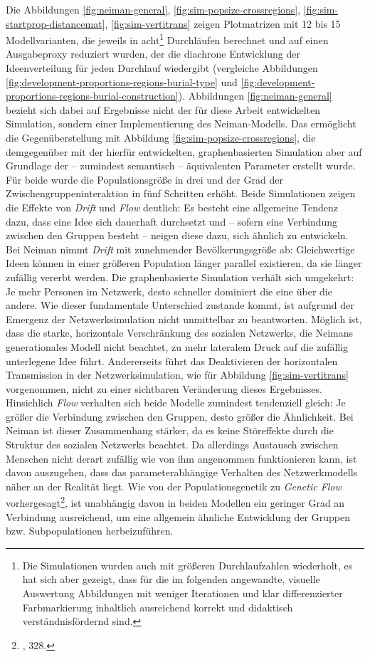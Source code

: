 \documentclass[openany,twoside,twocolumn]{book}
\let\rmarkdownfootnote\footnote%
\def\footnote{\protect\rmarkdownfootnote}
\begin{document}
Die Abbildungen \ref{fig:neiman-general},
\ref{fig:sim-popsize-crossregions}, \ref{fig:sim-startprop-distancemat},
\ref{fig:sim-vertitrans} zeigen Plotmatrizen mit 12 bis 15
Modellvarianten, die jeweils in acht\footnote{Die Simulationen wurden
  auch mit größeren Durchlaufzahlen wiederholt, es hat sich aber
  gezeigt, dass für die im folgenden angewandte, visuelle Auswertung
  Abbildungen mit weniger Iterationen und klar differenzierter
  Farbmarkierung inhaltlich ausreichend korrekt und didaktisch
  verständnisfördernd sind.} Durchläufen berechnet und auf einen
Ausgabeproxy reduziert wurden, der die diachrone Entwicklung der
Ideenverteilung für jeden Durchlauf wiedergibt (vergleiche Abbildungen
\ref{fig:development-proportions-regions-burial-type} und
\ref{fig:development-proportions-regions-burial-construction}).
Abbildungen \ref{fig:neiman-general} bezieht sich dabei auf Ergebnisse
nicht der für diese Arbeit entwickelten Simulation, sondern einer
Implementierung des Neiman-Modells. Das ermöglicht die Gegenüberstellung
mit Abbildung \ref{fig:sim-popsize-crossregions}, die demgegenüber mit
der hierfür entwickelten, graphenbasierten Simulation aber auf Grundlage
der -- zumindest semantisch -- äquivalenten Parameter erstellt wurde.
Für beide wurde die Populationsgröße in drei und der Grad der
Zwischengruppeninteraktion in fünf Schritten erhöht. Beide Simulationen
zeigen die Effekte von \emph{Drift} und \emph{Flow} deutlich: Es besteht
eine allgemeine Tendenz dazu, dass eine Idee sich dauerhaft durchsetzt
und -- sofern eine Verbindung zwischen den Gruppen besteht -- neigen
diese dazu, sich ähnlich zu entwickeln. Bei Neiman nimmt \emph{Drift}
mit zunehmender Bevölkerungsgröße ab: Gleichwertige Ideen können in
einer größeren Population länger parallel existieren, da sie länger
zufällig vererbt werden. Die graphenbasierte Simulation verhält sich
umgekehrt: Je mehr Personen im Netzwerk, desto schneller dominiert die
eine über die andere. Wie dieser fundamentale Unterschied zustande
kommt, ist aufgrund der Emergenz der Netzwerksimulation nicht
unmittelbar zu beantworten. Möglich ist, dass die starke, horizontale
Verschränkung des sozialen Netzwerks, die Neimans generationales Modell
nicht beachtet, zu mehr lateralem Druck auf die zufällig unterlegene
Idee führt. Andererseits führt das Deaktivieren der horizontalen
Transmission in der Netzwerksimulation, wie für Abbildung
\ref{fig:sim-vertitrans} vorgenommen, nicht zu einer sichtbaren
Veränderung dieses Ergebnisses. Hinsichlich \emph{Flow} verhalten sich
beide Modelle zumindest tendenziell gleich: Je größer die Verbindung
zwischen den Gruppen, desto größer die Ähnlichkeit. Bei Neiman ist
dieser Zusammenhang stärker, da es keine Störeffekte durch die Struktur
des sozialen Netzwerks beachtet. Da allerdings Austausch zwischen
Menschen nicht derart zufällig wie von ihm angenommen funktionieren
kann, ist davon auszugehen, dass das parameterabhängige Verhalten des
Netzwerkmodells näher an der Realität liegt. Wie von der
Populationsgenetik zu \emph{Genetic Flow} vorhergesagt\footnote{\textcite{frankham_introduction_2002},
  328.}, ist unabhängig davon in beiden Modellen ein geringer Grad an
Verbindung ausreichend, um eine allgemein ähnliche Entwicklung der
Gruppen bzw. Subpopulationen herbeizuführen.
\end{document}
